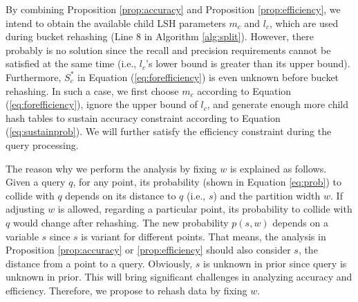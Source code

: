 
By combining Proposition \ref{prop:accuracy} and Proposition \ref{prop:efficiency}, we intend to obtain the available child LSH parameters $m_c$ and $l_c$, which are used during bucket rehashing (Line 8 in Algorithm \ref{alg:split}). However, there probably is no solution since the recall and precision requirements cannot be satisfied at the same time (i.e., $l_c$'s lower bound is greater than its upper bound). Furthermore, $S_c^*$ in Equation (\ref{eq:forefficiency}) is even unknown before bucket rehashing. In such a case, we first choose $m_c$ according to Equation (\ref{eq:forefficiency}), ignore the upper bound of $l_c$, and generate enough more child hash tables to sustain accuracy constraint according to Equation (\ref{eq:sustainprob}). We will further satisfy the efficiency constraint during the query processing.

The reason why we perform the analysis by fixing $w$ is explained as follows. Given a query $q$, for any point, its probability (shown in Equation \ref{eq:prob}) to collide with $q$ depends on its distance to $q$ (i.e., $s$) and the partition width $w$. If adjusting $w$ is allowed, regarding a particular point, its probability to collide with $q$ would change after rehashing. The new probability $p(s, w)$ depends on a variable $s$ since $s$ is variant for different points. That means, the analysis in Proposition \ref{prop:accuracy} or \ref{prop:efficiency} should also consider $s$, the distance from a point to a query. Obviously, $s$ is unknown in prior since query is unknown in prior. This will bring significant challenges in analyzing accuracy and efficiency. Therefore, we propose to rehash data by fixing $w$.




